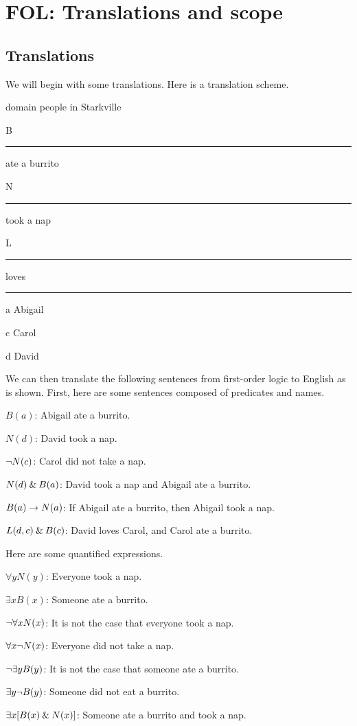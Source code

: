 \graphicspath{{figures--proofs/}}

\chapter{FOL: Translations and scope}\label{FOL-basics}

\section{Translations}

We will begin with some translations. Here is a translation scheme.

\begin{ekey}
	\item[\textrm{domain}] people in Starkville
	\item[B] \rule{1cm}{0.15mm} ate a burrito
	\item[N] \rule{1cm}{0.15mm} took a nap
	\item[L] \rule{1cm}{0.15mm} loves \rule{1cm}{0.15mm}
	\item[a] Abigail
	\item[c] Carol
	\item[d] David
\end{ekey}

\noindent We can then translate the following sentences from first-order logic to English as is shown. First, here are some sentences composed of predicates and names.

\begin{ebullet}
	\item[]$B(a) $: Abigail ate a burrito.\smallskip
	\item[]$N(d) $: David took a nap.\smallskip
	\item[]${\neg} N(c)$: Carol did not take a nap.\smallskip
	\item[]$N(d) \mathbin{\&} B(a) $: David took a nap and Abigail ate a burrito.\smallskip
	\item[]$B(a) \rightarrow N(a)$: If Abigail ate a burrito, then Abigail took a nap.\smallskip
	\item[]$L(d,c) \mathbin{\&} B(c)$: David loves Carol, and Carol ate a burrito.
\end{ebullet}

\noindent Here are some quantified expressions.

\begin{ebullet}
	\item[] $\forall y N(y)$: Everyone took a nap.\smallskip
	\item[] $\exists x B(x)$: Someone ate a burrito.\smallskip
	\item[] ${\neg}\forall xN(x)$: It is not the case that everyone took a nap.\smallskip
	\item[]$\forall x {\neg} N(x)$: Everyone did not take a nap.\smallskip
	\item[]${\neg}\exists yB(y)$: It is not the case that someone ate a burrito.\smallskip
	\item[]$\exists y {\neg} B(y)$: Someone did not eat a burrito.\smallskip
	\item[]$\exists x[B(x) \mathbin{\&} N(x)]$: Someone ate a burrito and took a nap.\smallskip
\end{ebullet}
	
